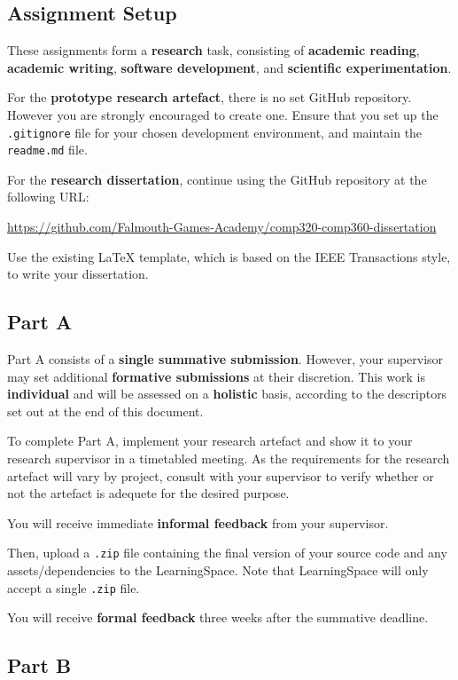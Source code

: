 \documentclass{../fal_assignment}
\begin{document}
\subsection*{Assignment Setup}

These assignments form a \textbf{research} task, consisting of \textbf{academic reading}, \textbf{academic writing},
\textbf{software development}, and \textbf{scientific experimentation}.

For the \textbf{prototype research artefact}, there is no set GitHub repository.
However you are strongly encouraged to create one.
Ensure that you set up the \texttt{.gitignore} file for your chosen development environment,
and maintain the \texttt{readme.md} file.

For the \textbf{research dissertation}, continue using the GitHub repository at the following URL:

\indent \url{https://github.com/Falmouth-Games-Academy/comp320-comp360-dissertation}

Use the existing LaTeX template, which is based on the IEEE Transactions style,
to write your dissertation.

\subsection*{Part A}

Part A consists of a \textbf{single summative submission}.
However, your supervisor may set additional \textbf{formative submissions} at their discretion.
This work is \textbf{individual} and will be assessed on a \textbf{holistic} basis, according to the descriptors set out at the end of this document.

To complete Part A, implement your research artefact and show it to your research supervisor in a timetabled meeting. As
the requirements for the research artefact will vary by project, consult with your supervisor to verify whether or not the
artefact is adequete for the desired purpose.

You will receive immediate \textbf{informal feedback} from your supervisor.

Then, upload a \texttt{.zip} file containing the final version of your source code and any assets/dependencies to the LearningSpace.
Note that LearningSpace will only accept a single \texttt{.zip} file.

You will receive \textbf{formal feedback} three weeks after the summative deadline.

\subsection*{Part B}
\end{document}
